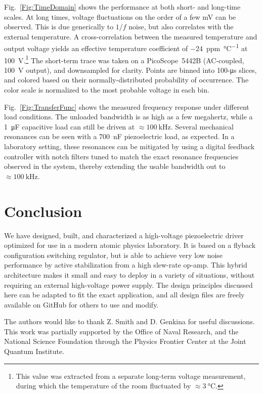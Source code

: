 \documentclass[aip,rsi,reprint]{revtex4-1} %
\begin{document}
Fig.~\ref{Fig:TimeDomain} shows the performance at both short- and long-time scales.
At long times, voltage fluctuations on the order of a few \si{\milli\volt} can be observed.
This is due generically to $1/f$ noise, but also correlates with the external temperature.
A cross-correlation between the measured temperature and output voltage yields an effective temperature coefficient of \SI[per-mode=symbol]{-24}{ppm\per\celsius} at \SI{100}{\volt}.\footnote{This value was extracted from a separate long-term voltage measurement, during which the temperature of the room fluctuated by $\approx \SI{3}{\celsius}$.}
The short-term trace was taken on a PicoScope~5442B (AC-coupled, \SI{100}{\volt} output), and downsampled for clarity.
Points are binned into 100-\si{\micro\second} slices, and colored based on their normally-distributed probability of occurrence.
The color scale is normalized to the most probable voltage in each bin.

Fig.~\ref{Fig:TransferFunc} shows the measured frequency response under different load conditions. The unloaded bandwidth is as high as a few megahertz, while a \SI{1}{\micro\farad} capacitive load can still be driven at $\approx\SI{100}{\kilo\hertz}$. 
Several mechanical resonances can be seen with a \SI{700}{\nano\farad} piezoelectric load, as expected.
In a laboratory setting, these resonances can be mitigated by using a digital feedback controller with notch filters tuned to match the exact resonance frequencies observed in the system\cite{Ryou2016a}, thereby extending the usable bandwidth out to $\approx\SI{100}{\kilo\hertz}$.


\section{Conclusion}
\label{Sec:Conclusion}

We have designed, built, and characterized a high-voltage piezoelectric driver optimized for use in a modern atomic physics laboratory.
It is based on a flyback configuration switching regulator, but is able to achieve very low noise performance by active stabilization from a high slew-rate op-amp.
This hybrid architecture makes it small and easy to deploy in a variety of situations, without requiring an external high-voltage power supply.
The design principles discussed here can be adapted to fit the exact application, and all design files are freely available on GitHub for others to use and modify.

\begin{acknowledgments}
The authors would like to thank Z. Smith and D. Genkina for useful discussions.
This work was partially supported by the Office of Naval Research, and the National Science Foundation through the Physics Frontier Center at the Joint Quantum Institute.
\end{acknowledgments}


\end{document}
